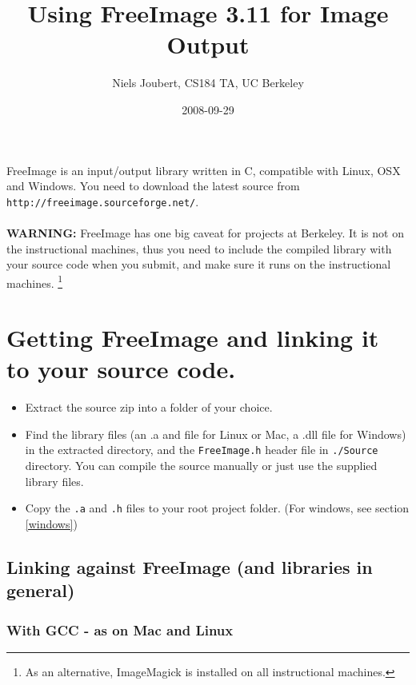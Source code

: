 \documentclass[]{article}
\title{Using FreeImage 3.11 for Image Output}
\author{ Niels Joubert, CS184 TA, UC Berkeley }
\date{2008-09-29}
\begin{document}
\ifpdf
{}
\else
{}
\fi

\maketitle

FreeImage is an input/output library written in C, compatible with Linux, OSX and Windows. You need to download the latest source from \verb=http://freeimage.sourceforge.net/=.\\
\\
\textbf{WARNING:} FreeImage has one big caveat for projects at Berkeley. It is not on the instructional machines, thus you need to include the compiled library with your source code when you submit, and make sure it runs on the instructional machines. \footnote{As an alternative, ImageMagick is installed on all instructional machines.}

\section{Getting FreeImage and linking it to your source code.}\label{compileANDlink}

\begin{itemize}
    \item Extract the source zip into a folder of your choice.
    
    \item Find the library files (an .a and file for Linux or Mac, a .dll file for Windows) in the extracted directory, and the \verb=FreeImage.h= header file in \verb=./Source= directory. You can compile the source manually or just use the supplied library files.
    
    \item Copy the \verb=.a= and \verb=.h= files to your root project folder. (For windows, see section \ref{windows})
    
\end{itemize}

\subsection{Linking against FreeImage (and libraries in general)}

\subsubsection{With GCC - as on Mac and Linux}
\end{document}
